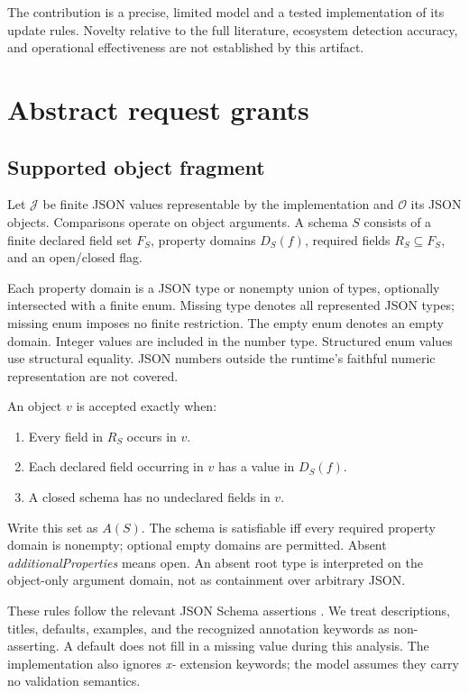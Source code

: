 The contribution is a precise, limited model and a tested implementation of its update rules. Novelty relative to the full literature, ecosystem detection accuracy, and operational effectiveness are not established by this artifact.

\section{Abstract request grants}\label{abstract-request-grants}

\subsection{Supported object fragment}\label{supported-object-fragment}

Let \(\mathcal J\) be finite JSON values representable by the implementation and \(\mathcal O\) its JSON objects. Comparisons operate on object arguments. A schema \(S\) consists of a finite declared field set \(F_S\), property domains \(D_S(f)\), required fields \(R_S\subseteq F_S\), and an open/closed flag.

Each property domain is a JSON type or nonempty union of types, optionally intersected with a finite enum. Missing type denotes all represented JSON types; missing enum imposes no finite restriction. The empty enum denotes an empty domain. Integer values are included in the number type. Structured enum values use structural equality. JSON numbers outside the runtime's faithful numeric representation are not covered.

An object \(v\) is accepted exactly when:

\begin{enumerate}
\def\labelenumi{\arabic{enumi}.}
\tightlist
\item
  Every field in \(R_S\) occurs in \(v\).
\item
  Each declared field occurring in \(v\) has a value in \(D_S(f)\).
\item
  A closed schema has no undeclared fields in \(v\).
\end{enumerate}

Write this set as \(A(S)\). The schema is satisfiable iff every required property domain is nonempty; optional empty domains are permitted. Absent \emph{additionalProperties} means open. An absent root type is interpreted on the object-only argument domain, not as containment over arbitrary JSON.

These rules follow the relevant JSON Schema assertions \citep{json-validation, json-core}. We treat descriptions, titles, defaults, examples, and the recognized annotation keywords as non-asserting. A default does not fill in a missing value during this analysis. The implementation also ignores \emph{x-} extension keywords; the model assumes they carry no validation semantics.

